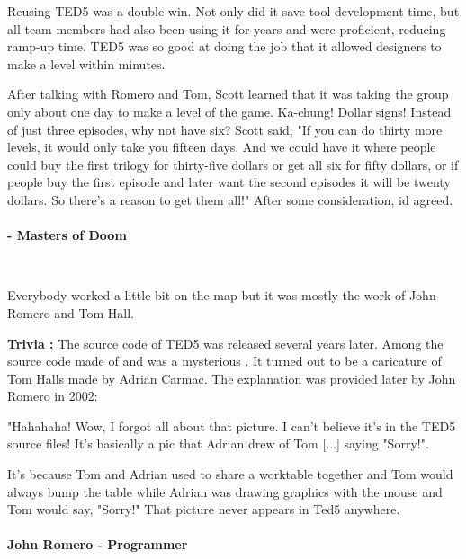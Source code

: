 \documentclass[book.tex]{subfiles}
\begin{document}
Reusing TED5 was a double win. Not only did it save tool development time, but all team members had also been using it for years and were proficient, reducing ramp-up time. TED5 was so good at doing the job that it allowed designers to make a level within minutes.\\
\par

 \begin{fancyquotes}
After talking with Romero and Tom, Scott learned that it was taking the group only about one day to make a level of the game. Ka-chung! Dollar signs! Instead of just three episodes, why not have six? Scott said, "If you can do thirty more levels, it would only take you fifteen days. And we could have it where people could buy the first trilogy for thirty-five dollars or get all six for fifty dollars, or if people buy the first episode and later want the second episodes it will be twenty dollars. So there's a reason to get them all!" After some consideration, id agreed.\\
\\
 \textbf{- Masters of Doom}
 \end{fancyquotes}\\

\par
Everybody worked a little bit on the map but it was mostly the work of John Romero and Tom Hall.\\
\par
 \textbf{\underline{Trivia :}} The source code of TED5 was released several years later. Among the source code made of  and  was a mysterious . It turned out to be a caricature of Tom Halls made by Adrian Carmac. The explanation was provided later by John Romero in 2002:\\
\par
 \begin{fancyquotes}
   "Hahahaha! Wow, I forgot all about that picture. I can't believe it's 
in the TED5 source files! It's basically a pic that Adrian drew of Tom 
[...] saying "Sorry!".\\
\par 
It's because Tom and Adrian used to share a worktable together and Tom 
would always bump the table while Adrian was drawing graphics with the 
mouse and Tom would say, "Sorry!" That picture never appears in Ted5 
anywhere.\\
   \\
\textbf{John Romero - Programmer}
 \end{fancyquotes}\\
\end{document}

